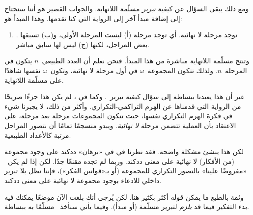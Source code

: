 \documentclass[../../../include/open-logic-section]{subfiles}
\begin{document}
ومع ذلك يبقى السؤال عن كيفية \emph{تبرير} مسلّمة اللانهاية. والجواب
القصير هو أننا سنحتاج إلى إضافة مبدأ آخر إلى الرواية التي كنا نقدمها.
وهذا المبدأ هو:
\begin{enumerate}
	\item[] \stagesinf. توجد مرحلة لا نهائية. أي توجد مرحلة (أ) ليست المرحلة الأولى، و(ب) تسبقها بعض المراحل، لكنها (ج) ليس لها سابق مباشر.
\end{enumerate}
وتنتج مسلّمة اللانهاية مباشرة من هذا المبدأ. فنحن نعلم أن العدد
الطبيعي~$n$ يتكون في المرحلة~$n$. ولذلك تتكون المجموعة~$\omega$ في
أول مرحلة لا نهائية، وتكون~$\omega$ نفسها شاهدًا على مسلّمة اللانهاية.

غير أن هذا يعيدنا ببساطة إلى سؤال كيفية تبرير~\stagesinf. وكما في
\stagessucc، لم يكن هذا جزءًا صريحًا من الرواية التي قدمناها عن الهرم
التراكمي-التكراري. وأكثر من ذلك، لا يجبرنا شيء في فكرة الهرم التكراري
نفسها، حيث تتكون المجموعات مرحلة بعد مرحلة، على الاعتقاد بأن العملية
تتضمن مرحلة \emph{لا نهائية}. ويبدو منسجمًا تمامًا أن نتصور المراحل
مرتبة كالأعداد الطبيعية.

لكن هذا ينشئ مشكلة واضحة. فقد نظرنا في
 في «برهان» ددكند على وجود
مجموعة (من الأفكار) لا نهائية على معنى ددكند. وربما لم تجده مقنعًا
جدًا. لكن إذا لم يكن~\stagesinf{} «مفروضًا علينا» بالتصور التكراري
للمجموعة (أو بـ«قوانين الفكر»)، فإننا نظل بلا تبرير داخلي للادعاء بوجود
مجموعة لا نهائية على معنى ددكند.

وثمة بالطبع ما يمكن قوله أكثر بكثير هنا. لكن يُرجى أنك بلغت الآن موضعًا
يمكنك فيه بدء التفكير فيما قد \emph{يلزم} لتبرير مسلّمة (أو مبدأ).
وفيما يأتي سنأخذ~\stagesinf{} مسلّمًا به ببساطة.
\end{document}
